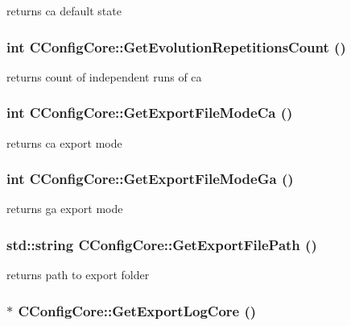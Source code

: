 \label{classCConfigCore_a7623630f4d5737b312f729d312586133}
returns ca default state \hypertarget{classCConfigCore_a44d31a6c355762c899b740c69114d47a}{
\subsubsection[{GetEvolutionRepetitionsCount}]{\setlength{\rightskip}{0pt plus 5cm}int CConfigCore::GetEvolutionRepetitionsCount ()}}
\label{classCConfigCore_a44d31a6c355762c899b740c69114d47a}
returns count of independent runs of ca \hypertarget{classCConfigCore_a6f7e26303227176cb4a7204104e4a1cb}{
\subsubsection[{GetExportFileModeCa}]{\setlength{\rightskip}{0pt plus 5cm}int CConfigCore::GetExportFileModeCa ()}}
\label{classCConfigCore_a6f7e26303227176cb4a7204104e4a1cb}
returns ca export mode \hypertarget{classCConfigCore_a1537d3260c6d823348ab0edadb780f29}{
\subsubsection[{GetExportFileModeGa}]{\setlength{\rightskip}{0pt plus 5cm}int CConfigCore::GetExportFileModeGa ()}}
\label{classCConfigCore_a1537d3260c6d823348ab0edadb780f29}
returns ga export mode \hypertarget{classCConfigCore_a37d7199706fa48c52c534a96c9c33591}{
\subsubsection[{GetExportFilePath}]{\setlength{\rightskip}{0pt plus 5cm}std::string CConfigCore::GetExportFilePath ()}}
\label{classCConfigCore_a37d7199706fa48c52c534a96c9c33591}
returns path to export folder \hypertarget{classCConfigCore_acefc129bafcc6fb8a22c901b74d0c65a}{
\subsubsection[{GetExportLogCore}]{ $\ast$ CConfigCore::GetExportLogCore ()}}
